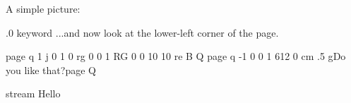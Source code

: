 A simple picture:

%

.0 {\cs{} keyword}
...and now look at the lower-left corner of the page.\par
\pdfliteral page {q 1 j 0 1 0 rg 0 0 1 RG 0 0 10 10 re B Q}
\pdfliteral page {q -1 0 0 1 612 0 cm .5 g}\hfill Do you like that?\pdfliteral page {Q}
\endfeature

\bigskip


\pdfrefobj \pdflastobj      %


\immediate \pdfobj stream   %
   {Hello}                  %

